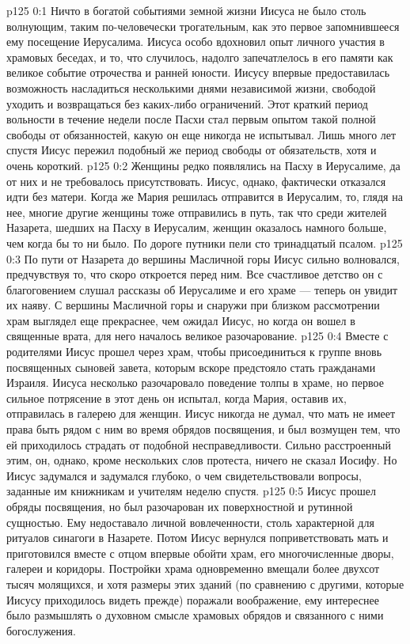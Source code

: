 \author{Комиссия срединников}
\vs p125 0:1 Ничто в богатой событиями земной жизни Иисуса не было столь волнующим, таким по\hyp{}человечески трогательным, как это первое запомнившееся ему посещение Иерусалима. Иисуса особо вдохновил опыт личного участия в храмовых беседах, и то, что случилось, надолго запечатлелось в его памяти как великое событие отрочества и ранней юности. Иисусу впервые предоставилась возможность насладиться несколькими днями независимой жизни, свободой уходить и возвращаться без каких\hyp{}либо ограничений. Этот краткий период вольности в течение недели после Пасхи стал первым опытом такой полной свободы от обязанностей, какую он еще никогда не испытывал. Лишь много лет спустя Иисус пережил подобный же период свободы от обязательств, хотя и очень короткий.
\vs p125 0:2 \pc Женщины редко появлялись на Пасху в Иерусалиме, да от них и не требовалось присутствовать. Иисус, однако, фактически отказался идти без матери. Когда же Мария решилась отправится в Иерусалим, то, глядя на нее, многие другие женщины тоже отправились в путь, так что среди жителей Назарета, шедших на Пасху в Иерусалим, женщин оказалось намного больше, чем когда бы то ни было. По дороге путники пели сто тринадцатый псалом.
\vs p125 0:3 По пути от Назарета до вершины Масличной горы Иисус сильно волновался, предчувствуя то, что скоро откроется перед ним. Все счастливое детство он с благоговением слушал рассказы об Иерусалиме и его храме --- теперь он увидит их наяву. С вершины Масличной горы и снаружи при близком рассмотрении храм выглядел еще прекраснее, чем ожидал Иисус, но когда он вошел в священные врата, для него началось великое разочарование.
\vs p125 0:4 Вместе с родителями Иисус прошел через храм, чтобы присоединиться к группе вновь посвященных сыновей завета, которым вскоре предстояло стать гражданами Израиля. Иисуса несколько разочаровало поведение толпы в храме, но первое сильное потрясение в этот день он испытал, когда Мария, оставив их, отправилась в галерею для женщин. Иисус никогда не думал, что мать не имеет права быть рядом с ним во время обрядов посвящения, и был возмущен тем, что ей приходилось страдать от подобной несправедливости. Сильно расстроенный этим, он, однако, кроме нескольких слов протеста, ничего не сказал Иосифу. Но Иисус задумался и задумался глубоко, о чем свидетельствовали вопросы, заданные им книжникам и учителям неделю спустя.
\vs p125 0:5 Иисус прошел обряды посвящения, но был разочарован их поверхностной и рутинной сущностью. Ему недоставало личной вовлеченности, столь характерной для ритуалов синагоги в Назарете. Потом Иисус вернулся поприветствовать мать и приготовился вместе с отцом впервые обойти храм, его многочисленные дворы, галереи и коридоры. Постройки храма одновременно вмещали более двухсот тысяч молящихся, и хотя размеры этих зданий (по сравнению с другими, которые Иисусу приходилось видеть прежде) поражали воображение, ему интереснее было размышлять о духовном смысле храмовых обрядов и связанного с ними богослужения.
